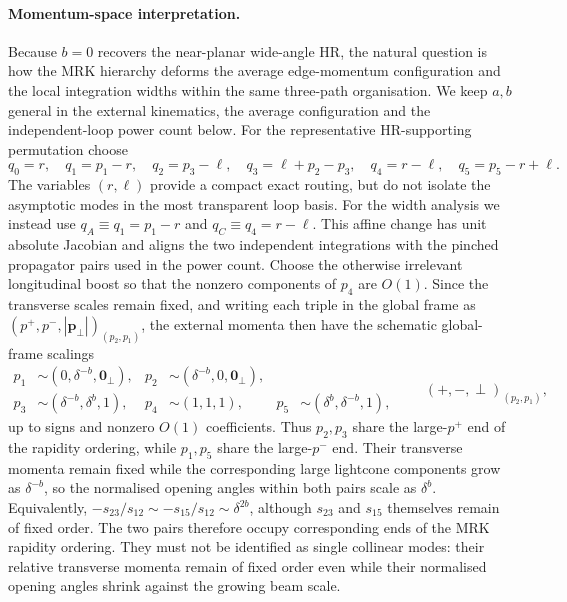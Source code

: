 \documentclass[a4paper,11pt]{article}
\begin{document}
\paragraph{Momentum-space interpretation.}
Because \(b=0\) recovers the near-planar wide-angle HR, the natural question
is how the MRK hierarchy deforms the average edge-momentum configuration and
the local integration widths within the same three-path organisation.  We keep
\(a,b\) general in the external kinematics, the average configuration and the
independent-loop power count below.  For the representative HR-supporting
permutation choose
\begin{equation}
 q_0=r,\quad q_1=p_1-r,\quad q_2=p_3-\ell,\quad
 q_3=\ell+p_2-p_3,\quad q_4=r-\ell,\quad
 q_5=p_5-r+\ell .
 \label{eq:five-mrk-planar-mode-routing}
\end{equation}
The variables \((r,\ell)\) provide a compact exact routing, but do not isolate
the asymptotic modes in the most transparent loop basis.  For the width
analysis we instead use
\(q_A\equiv q_1=p_1-r\) and \(q_C\equiv q_4=r-\ell\).  This affine change has
unit absolute Jacobian and aligns the two independent integrations with the
pinched propagator pairs used in the power count.
Choose the otherwise irrelevant longitudinal boost so that the nonzero
components of \(p_4\) are \(O(1)\).  Since the transverse scales remain
fixed, and writing each triple in the global frame as
\((p^+,p^-,|\boldsymbol p_\perp|)_{(p_2,p_1)}\), the external momenta then have the
schematic global-frame scalings
\begin{equation}
 \begin{aligned}
 p_1&\sim(0,\delta^{-b},\boldsymbol0_\perp),&
 p_2&\sim(\delta^{-b},0,\boldsymbol0_\perp),\\
 p_3&\sim(\delta^{-b},\delta^b,1),&
 p_4&\sim(1,1,1),&
 p_5&\sim(\delta^b,\delta^{-b},1),
 \end{aligned}
 \qquad (+,-,\perp)_{(p_2,p_1)},
 \label{eq:five-mrk-planar-external-modes}
\end{equation}
up to signs and nonzero \(O(1)\) coefficients.  Thus \(p_2,p_3\) share the
large-\(p^+\) end of the rapidity ordering, while \(p_1,p_5\) share the
large-\(p^-\) end.  Their transverse momenta remain fixed while the
corresponding large lightcone components grow as \(\delta^{-b}\), so the
normalised opening angles within both pairs scale as \(\delta^b\).
Equivalently,
\(-s_{23}/s_{12}\sim-s_{15}/s_{12}\sim\delta^{2b}\), although
\(s_{23}\) and \(s_{15}\) themselves remain of fixed order.  The two pairs
therefore occupy corresponding ends of the MRK rapidity ordering.  They must
not be identified as single collinear modes: their relative transverse
momenta remain of fixed order even while their normalised opening angles
shrink against the growing beam scale.
\end{document}
